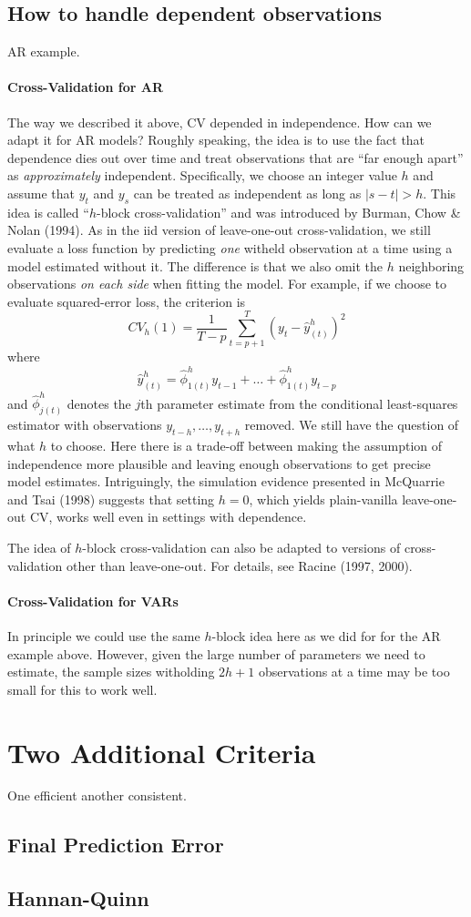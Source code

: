 \documentclass[12pt]{article}
\theoremstyle{definition}
\begin{document}
\subsection{How to handle dependent observations}
AR example.



\paragraph{Cross-Validation for AR}
The way we described it above, CV depended in independence. How can we adapt it for AR models? Roughly speaking, the idea is to use the fact that dependence dies out over time and treat observations that are ``far enough apart'' as \emph{approximately} independent. Specifically, we choose an integer value $h$ and assume that $y_t$ and $y_s$ can be treated as independent as long as $|s - t|>h$. This idea is called ``$h$-block cross-validation'' and was introduced by Burman, Chow \& Nolan (1994). As in the iid version of leave-one-out cross-validation, we still evaluate a loss function by predicting \emph{one} witheld observation at a time using a model estimated without it. The difference is that we also omit the $h$ neighboring observations \emph{on each side} when fitting the model. For example, if we choose to evaluate squared-error loss, the criterion is
	$$CV_h(1) = \frac{1}{T-p}\sum_{t = p+1}^T \left(y_t - \hat{y}_{(t)}^h\right)^2$$
where 
$$\hat{y}^h_{(t)} = \hat{\phi}^h_{1(t)} y_{t-1} + \hdots + \hat{\phi}^h_{1(t)}y_{t-p}$$
and $\hat{\phi}^h_{j(t)}$ denotes the $j$th parameter estimate from the conditional least-squares estimator with observations $y_{t-h}, \hdots,  y_{t+h}$ removed. We still have the question of what $h$ to choose. Here there is a trade-off between making the assumption of independence more plausible and leaving enough observations to get precise model estimates. Intriguingly, the simulation evidence presented in McQuarrie and Tsai (1998) suggests that setting $h=0$, which yields plain-vanilla leave-one-out CV, works well even in settings with dependence.

The idea of $h$-block cross-validation can also be adapted to versions of cross-validation other than leave-one-out. For details, see Racine (1997, 2000).

\paragraph{Cross-Validation for VARs} In principle we could use the same $h$-block idea here as we did for for the AR example above. However, given the large number of parameters we need to estimate, the sample sizes witholding $2h+1$ observations at a time may be too small for this to work well. 





\section{Two Additional Criteria}
One efficient another consistent.
\subsection{Final Prediction Error}
\subsection{Hannan-Quinn}
\end{document}
